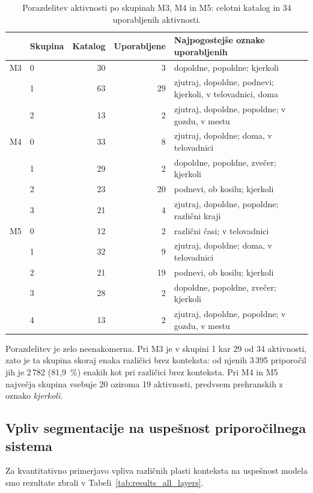 \documentclass[a4paper,twoside,openright,12pt,slovene]{book}
\begin{document}
\begin{table}[htbp]
\centering
\caption{Porazdelitev aktivnosti po skupinah M3, M4 in M5: celotni katalog
in 34 uporabljenih aktivnosti.}
\label{tab:group_sizes}
\footnotesize
\begin{tabular}{llrrp{6.4cm}}
\toprule
 & Skupina & Katalog & Uporabljene & Najpogostejše oznake uporabljenih \\
\midrule
M3 & 0 & 30 & 3 & dopoldne, popoldne; kjerkoli \\
   & 1 & 63 & 29 & zjutraj, dopoldne, podnevi; kjerkoli, v telovadnici, doma \\
   & 2 & 13 & 2 & zjutraj, dopoldne, popoldne; v gozdu, v mestu \\
\midrule
M4 & 0 & 33 & 8 & zjutraj, dopoldne; doma, v telovadnici \\
   & 1 & 29 & 2 & dopoldne, popoldne, zvečer; kjerkoli \\
   & 2 & 23 & 20 & podnevi, ob kosilu; kjerkoli \\
   & 3 & 21 & 4 & zjutraj, dopoldne, popoldne; različni kraji \\
\midrule
M5 & 0 & 12 & 2 & različni časi; v telovadnici \\
   & 1 & 32 & 9 & zjutraj, dopoldne; doma, v telovadnici \\
   & 2 & 21 & 19 & podnevi, ob kosilu; kjerkoli \\
   & 3 & 28 & 2 & dopoldne, popoldne, zvečer; kjerkoli \\
   & 4 & 13 & 2 & zjutraj, dopoldne, popoldne; v gozdu, v mestu \\
\bottomrule
\end{tabular}
\end{table}

Porazdelitev je zelo neenakomerna. Pri M3 je v skupini 1 kar 29 od
34 aktivnosti, zato je ta skupina skoraj enaka različici brez konteksta:
od njenih 3\,395 priporočil jih je 2\,782 (81,9~\%) enakih kot pri različici
brez konteksta. Pri M4 in M5 največja skupina vsebuje 20 oziroma
19 aktivnosti, predvsem prehranskih z oznako \emph{kjerkoli}.

\subsection{Vpliv segmentacije na uspešnost priporočilnega sistema}

Za kvantitativno primerjavo vpliva različnih plasti konteksta na uspešnost modela 
smo rezultate zbrali v Tabeli~\ref{tab:results_all_layers}. 
\end{document}
